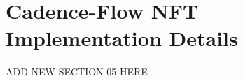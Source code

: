 \documentclass[../main.tex]{subfiles}
\begin{document}
\section{Cadence-Flow NFT Implementation Details}
\label{sec:cadence_flow_nft_implementation}
ADD NEW SECTION 05 HERE
\end{document}
